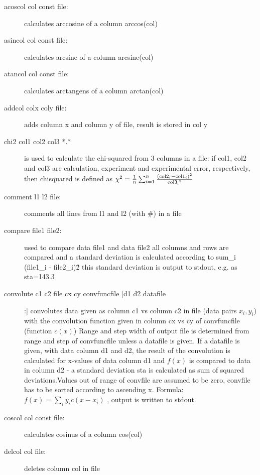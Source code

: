 \begin{description}
\item [\prg acoscol col const file:] calculates arccosine of a column arccos(col) 
\item [\prg asincol col const file:] calculates arcsine of a column arcsine(col) 
\item [\prg atancol col const file:] calculates arctangens of a column %
arctan(col) 
\item [\prg addcol  colx coly file:] adds column x and column y of file, result is %
stored in col y
\item [\prg chi2 col1 col2 col3 *.*] is used to calculate the 
 chi-squared from 3 columns in a file: if col1, col2 and col3 are calculation, 
 experiment and experimental error, respectively, then
  chisquared is defined as $\chi^2=\frac{1}{n}\sum_{i=1}^n \frac{({\rm col2}_i-{\rm %
col1}_i)^2}{{\rm col3_i}^2}$
\item [\prg comment l1 l2 file:] comments all lines from l1 and l2  (with \#) in a file
\item [\prg compare file1 file2:] used to compare data file1 and data file2
                all columns and rows are compared and a standard deviation
                is calculated according to sum\_i (file1\_i - file2\_i)\^2
                this standard deviation is output to stdout, e.g. as sta=143.3
\item [\prg convolute c1 c2 file cx cy convfuncfile [d1 d2 datafile]:] %
convolutes data given as column c1 vs column
                       c2 in file (data pairs $x_i,y_i$) with the convolution function given in %
column cx vs cy
		        of convfuncfile (function $c(x)$)
		       Range and step width of output file is determined from range and step 
		        of convfuncfile  unless a datafile is given. If a datafile is given, 
		     with data column d1 and d2, the result of the convolution is
		     calculated for x-values of data column d1 and $f(x)$ is compared to
		     data in column d2 - a standard deviation sta is calculated as
		     sum of squared deviations.Values out of range of convfile are assumed to be zero,
			convfile has to be sorted according to ascending x.
			Formula: $f(x)=\sum_i y_i c(x-x_i)$ , 
		       output is written to stdout. 
\item [\prg coscol col const file:] calculates cosinus of a column cos(col) 
\item [\prg delcol col file:] deletes column col in file

\end{description}

